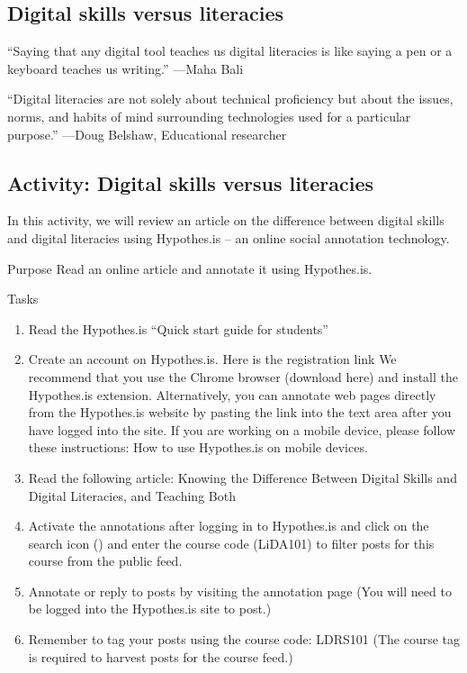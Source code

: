 \documentclass[
]{book}
\providecommand{\tightlist}{%
  \setlength{\itemsep}{0pt}\setlength{\parskip}{0pt}}
\theoremstyle{definition}
\theoremstyle{definition}
\theoremstyle{definition}
\theoremstyle{definition}
\theoremstyle{remark}
\begin{document}
\begin{reflect}
{\subsection{Digital skills versus literacies}\label{digital-skills-versus-literacies}}

``Saying that any digital tool teaches us digital literacies is like saying a pen or a keyboard teaches us writing.''
---Maha Bali
\citet{Bali_Maha}

``Digital literacies are not solely about technical proficiency but about the issues, norms, and habits of mind surrounding technologies used for a particular purpose.''
---Doug Belshaw, Educational researcher

\hypertarget{activity-digital-skills-versus-literacies}{%
\subsection*{Activity: Digital skills versus literacies}\label{activity-digital-skills-versus-literacies}}
\end{reflect}
\begin{reflect}
In this activity, we will review an article on the difference between digital skills and digital literacies using Hypothes.is -- an online social annotation technology.

Purpose
Read an online article and annotate it using Hypothes.is.

Tasks

\begin{enumerate}
\def\labelenumi{\arabic{enumi}.}
\tightlist
\item
  Read the Hypothes.is ``Quick start guide for students''
\item
  Create an account on Hypothes.is. Here is the registration link
  We recommend that you use the Chrome browser (download here) and install the Hypothes.is extension. Alternatively, you can annotate web pages directly from the Hypothes.is website by pasting the link into the text area after you have logged into the site. If you are working on a mobile device, please follow these instructions: How to use Hypothes.is on mobile devices.
\item
  Read the following article: Knowing the Difference Between Digital Skills and Digital Literacies, and Teaching Both
\item
  Activate the annotations after logging in to Hypothes.is and click on the search icon () and enter the course code (LiDA101) to filter posts for this course from the public feed.
\item
  Annotate or reply to posts by visiting the annotation page (You will need to be logged into the Hypothes.is site to post.)
\item
  Remember to tag your posts using the course code: LDRS101 (The course tag is required to harvest posts for the course feed.)
\end{enumerate}
\end{reflect}
\end{document}
